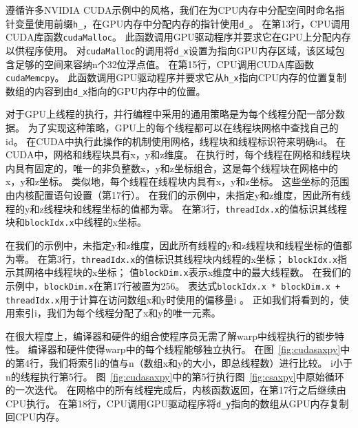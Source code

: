 遵循许多NVIDIA CUDA示例中的风格，我们在为CPU内存中分配空间时命名指针变量使用前缀\texttt{h\_}，在GPU内存中分配内存的指针使用\texttt{d\_}。 
在第13行，CPU调用CUDA库函数\texttt{cudaMalloc}。 
此函数调用GPU驱动程序并要求它在GPU上分配内存以供程序使用。 
对\texttt{cudaMalloc}的调用将\texttt{d\_x}设置为指向GPU内存区域，该区域包含足够的空间来容纳n个32位浮点值。 
在第15行，CPU调用CUDA库函数\texttt{cudaMemcpy}。 
此函数调用GPU驱动程序并要求它从\texttt{h\_x}指向CPU内存的位置复制数组的内容到由\texttt{d\_x}指向的GPU内存中的位置。

对于GPU上线程的执行，并行编程中采用的通用策略是为每个线程分配一部分数据。
为了实现这种策略，GPU上的每个线程都可以在线程块网格中查找自己的id。
在CUDA中执行此操作的机制使用网格，线程块和线程标识符来明确id。
在CUDA中，网格和线程块具有x，y和z维度。
在执行时，每个线程在网格和线程块内具有固定的，唯一的非负整数x，y和z坐标组合，这是每个线程块在网格中的x，y和z坐标。
类似地，每个线程在线程块内具有x，y和z坐标。
这些坐标的范围由内核配置语句设置（第17行）。
在我们的示例中，未指定y和z维度，因此所有线程的y和z线程块和线程坐标的值都为零。
在第3行，\texttt{threadIdx.x}的值标识其线程块和\texttt{blockIdx.x}中线程的x坐标。

在我们的示例中，未指定y和z维度，因此所有线程的y和z线程块和线程坐标的值都为零。
在第3行，\texttt{threadIdx.x}的值标识其线程块内线程的x坐标；
\texttt{blockIdx.x}指示其网格中线程块的x坐标；
值\texttt{blockDim.x}表示x维度中的最大线程数。
在我们的示例中，\texttt{blockDim.x}在第17行被置为256。
表达式\texttt{blockIdx.x * blockDim.x + threadIdx.x}用于计算在访问数组x和y时使用的偏移量i 。
正如我们将看到的，使用索引i，我们为每个线程分配了x和y的唯一元素。

在很大程度上，编译器和硬件的组合使程序员无需了解warp中线程执行的锁步特性。 
编译器和硬件使得warp中的每个线程能够独立执行。 
在图~\ref{fig:cudasaxpy}中的第4行，我们将索引i的值与n（数组x和y的大小，即总线程数）进行比较。 
i小于n的线程执行第5行。
图~\ref{fig:cudasaxpy}中的第5行执行图~\ref{fig:csaxpy}中原始循环的一次迭代。 
在网格中的所有线程完成后，内核函数返回，在第17行之后继续由CPU执行。
在第18行，CPU调用GPU驱动程序将\texttt{d\_y}指向的数组从GPU内存复制回CPU内存。

